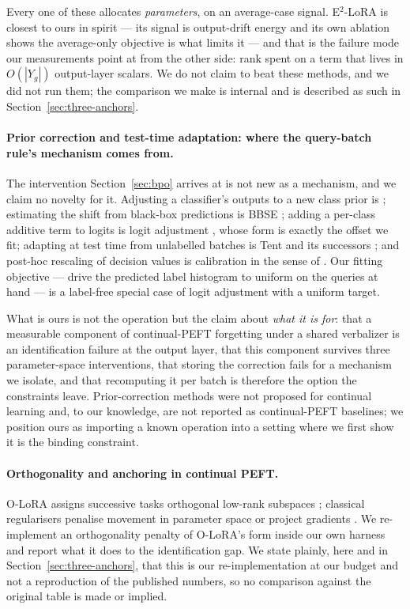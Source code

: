 Every one of these allocates \emph{parameters}, on an average-case signal.
E$^2$-LoRA is closest to ours in spirit --- its signal is output-drift energy and
its own ablation shows the average-only objective is what limits it --- and that is
the failure mode our measurements point at from the other side: rank spent on a
term that lives in $O(|Y_g|)$ output-layer scalars. We do not claim to beat these
methods, and we did not run them; the comparison we make is internal and is
described as such in Section~\ref{sec:three-anchors}.

\paragraph{Prior correction and test-time adaptation: where the query-batch rule's
mechanism comes from.}
The intervention Section~\ref{sec:bpo} arrives at is not new as a mechanism, and we
claim no novelty for it. Adjusting a classifier's outputs to a new class prior is
\citet{saerens2002adjusting}; estimating the shift from black-box predictions is
BBSE \citep{lipton2018bbse}; adding a per-class additive term to logits is logit
adjustment \citep{menon2021logit}, whose form is exactly the offset we fit;
adapting at test time from unlabelled batches is Tent and its successors
\citep{wang2021tent}; and post-hoc rescaling of decision values is calibration in
the sense of \citet{guo2017calibration}. Our fitting objective --- drive the
predicted label histogram to uniform on the queries at hand --- is a label-free
special case of logit adjustment with a uniform target.

What is ours is not the operation but the claim about \emph{what it is for}: that a
measurable component of continual-PEFT forgetting under a shared verbalizer is an
identification failure at the output layer, that this component survives three
parameter-space interventions, that storing the correction fails for a mechanism we
isolate, and that recomputing it per batch is therefore the option the constraints
leave. Prior-correction methods were not proposed for continual learning and, to
our knowledge, are not reported as continual-PEFT baselines; we position ours as
importing a known operation into a setting where we first show it is the binding
constraint.

\paragraph{Orthogonality and anchoring in continual PEFT.}
O-LoRA assigns successive tasks orthogonal low-rank subspaces
\citep{wang2023olora}; classical regularisers penalise movement in parameter
space \citep{kirkpatrick2017ewc} or project gradients
\citep{lopezpaz2017gem,farajtabar2020ogd,saha2021gpm}. We re-implement an
orthogonality penalty of O-LoRA's form inside our own harness and report what it
does to the identification gap. We state plainly, here and in
Section~\ref{sec:three-anchors}, that this is our re-implementation at our budget
and not a reproduction of the published numbers, so no comparison against the
original table is made or implied.

